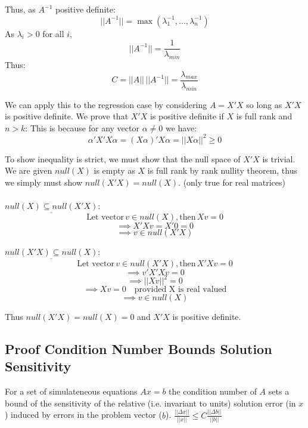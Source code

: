 \documentclass[DIV=14,titlepage=false]{scrreprt}
\begin{document}
Thus, as \(A^{-1}\) positive definite:
\[||A^{-1}||=\operatorname*{max}(\lambda_1^{-1},...,\lambda_n^{-1})\]
As \(\lambda_i>0\) for all \(i\),
\[||A^{-1}||=\frac{1}{\lambda_{min}}\]
Thus:\[C=||A|| \, ||A^{-1}||=\frac{\lambda_{max}}{\lambda_{min}}\]

\begin{note}
We can apply this to the regression case by considering \(A=X'X\) so long as \(X'X\) is positive definite. We prove that \(X'X\) is positive definite if \(X\) is full rank and \(n>k\):
This is because for any vector \(\alpha\neq0\) we have:
\[\alpha'X'X\alpha=(X\alpha)'X\alpha=||X\alpha||^2\geq0\]

To show inequality is strict, we must show that the null space of \(X'X\) is trivial.
We are given \(null(X)\) is empty as \(X\) is full rank by rank nullity theorem, thus we simply must show \(null(X'X) = null(X)\). (only true for real matrices)
\\ \\
\(\underline{null(X)\subseteq null(X'X)}\):
\[\text{Let vector} \, v\in null(X), \text{then} \, Xv=0\]
\[\implies X'Xv=X'0=0\]
\[\implies v\in null(X'X)\]

\(\underline{null(X'X)\subseteq null(X)}\):
\[\text{Let vector} \, v\in null(X'X), \text{then} \, X'Xv=0\]
\[\implies v'X'Xv=0\]
\[\implies ||Xv||^2=0\]
\[\implies Xv=0 \quad \text{provided X is real valued}\]
\[\implies v\in null(X)\]

Thus \(null(X'X)=null(X)=0\) and \(X'X\) is positive definite.
\end{note}

\subsection{Proof Condition Number Bounds Solution Sensitivity}

\begin{theorem}
    For a set of simulateneous equations \(Ax=b\) the condition number of \(A\) sets a bound of the sensitivity of the relative (i.e. invariant to units) solution error (in \(x\)) induced by errors in the problem vector (\(b\)). \(\frac{||\Delta x||}{||x||} \leq C \frac{||\Delta b||}{||b||}\)
\end{theorem}

\vspace{5mm}
\end{document}
